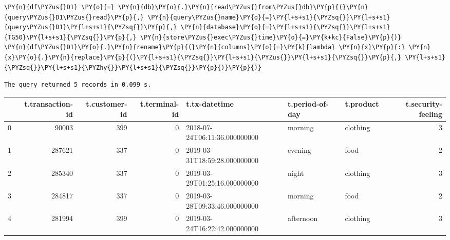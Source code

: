     \begin{tcolorbox}[breakable, size=fbox, boxrule=1pt, pad at break*=1mm,colback=cellbackground, colframe=cellborder]
\begin{Verbatim}[commandchars=\\\{\}]
\PY{n}{df\PYZus{}D1} \PY{o}{=} \PY{n}{db}\PY{o}{.}\PY{n}{read\PYZus{}from\PYZus{}db}\PY{p}{(}\PY{n}{query\PYZus{}D1\PYZus{}read}\PY{p}{,} \PY{n}{query\PYZus{}name}\PY{o}{=}\PY{l+s+s1}{\PYZsq{}}\PY{l+s+s1}{query\PYZus{}D1}\PY{l+s+s1}{\PYZsq{}}\PY{p}{,} \PY{n}{database}\PY{o}{=}\PY{l+s+s1}{\PYZsq{}}\PY{l+s+s1}{TG50}\PY{l+s+s1}{\PYZsq{}}\PY{p}{,} \PY{n}{store\PYZus{}exec\PYZus{}time}\PY{o}{=}\PY{k+kc}{False}\PY{p}{)}
\PY{n}{df\PYZus{}D1}\PY{o}{.}\PY{n}{rename}\PY{p}{(}\PY{n}{columns}\PY{o}{=}\PY{k}{lambda} \PY{n}{x}\PY{p}{:} \PY{n}{x}\PY{o}{.}\PY{n}{replace}\PY{p}{(}\PY{l+s+s1}{\PYZsq{}}\PY{l+s+s1}{\PYZus{}}\PY{l+s+s1}{\PYZsq{}}\PY{p}{,} \PY{l+s+s1}{\PYZsq{}}\PY{l+s+s1}{\PYZhy{}}\PY{l+s+s1}{\PYZsq{}}\PY{p}{)}\PY{p}{)}
\end{Verbatim}
\end{tcolorbox}

    \begin{Verbatim}[commandchars=\\\{\}]
The query returned 5 records in 0.099 s.
    \end{Verbatim}
 
            
    
    \begin{center}
\footnotesize
\begin{tabular}{lrrrlllr}
\toprule
 & t.transaction-id & t.customer-id & t.terminal-id & t.tx-datetime & t.period-of-day & t.product & t.security-feeling \\
\midrule
0 & 90003 & 399 & 0 & 2018-07-24T06:11:36.000000000 & morning & clothing & 3 \\
1 & 287621 & 337 & 0 & 2019-03-31T18:59:28.000000000 & evening & food & 2 \\
2 & 285340 & 337 & 0 & 2019-03-29T01:25:16.000000000 & night & clothing & 3 \\
3 & 284817 & 337 & 0 & 2019-03-28T09:33:46.000000000 & morning & food & 2 \\
4 & 281994 & 399 & 0 & 2019-03-24T16:22:42.000000000 & afternoon & clothing & 3 \\
\bottomrule
\end{tabular}

\end{center}

